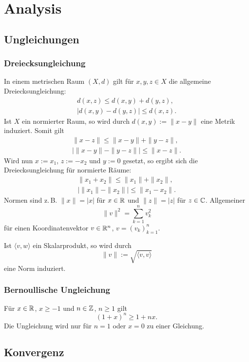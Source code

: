 
\chapter{Analysis}
\section{Ungleichungen}
\subsection{Dreiecksungleichung}
In einem metrischen Raum $(X,d)$ gilt für $x,y,z\in X$
die allgemeine Dreiecksungleichung:
\begin{gather}
d(x,z) \le d(x,y)+d(y,z),\\
|d(x,y)-d(y,z)|\le d(x,z).
\end{gather}
Ist $X$ ein normierter Raum, so wird durch $d(x,y) := \|x-y\|$
eine Metrik induziert. Somit gilt
\begin{gather}
\|x-z\| \le \|x-y\|+\|y-z\|,\\
|\|x-y\|-\|y-z\|| \le \|x-z\|.
\end{gather}
Wird nun $x:=x_1$, $z:=-x_2$ und $y:=0$ gesetzt, so ergibt sich
die Dreiecksungleichung für normierte Räume:
\begin{gather}
\|x_1+x_2\| \le \|x_1\|+\|x_2\|,\\
|\|x_1\|-\|x_2\||\le \|x_1-x_2\|.
\end{gather}
Normen sind z.\,B. $\|x\|=|x|$ für $x\in\mathbb R$ und $\|z\|=|z|$ für
$z\in\mathbb C$. Allgemeiner
\begin{equation}
\|v\|^2 = \sum_{k=1}^n v_k^2
\end{equation}
für einen Koordinatenvektor $v\in\mathbb R^n$, $v=(v_k)_{k=1}^n$.

Ist $\langle v,w\rangle$ ein Skalarprodukt, so wird durch
\begin{equation}
\|v\| := \sqrt{\langle v,v\rangle}
\end{equation}
eine Norm induziert.

\subsection{Bernoullische Ungleichung}
Für $x\in\mathbb R$, $x\ge -1$ und $n\in\mathbb Z$, $n\ge 1$ gilt
\begin{equation}
(1+x)^n \ge 1+nx.
\end{equation}
Die Ungleichung wird nur für $n=1$ oder $x=0$ zu einer Gleichung.

\section{Konvergenz}
